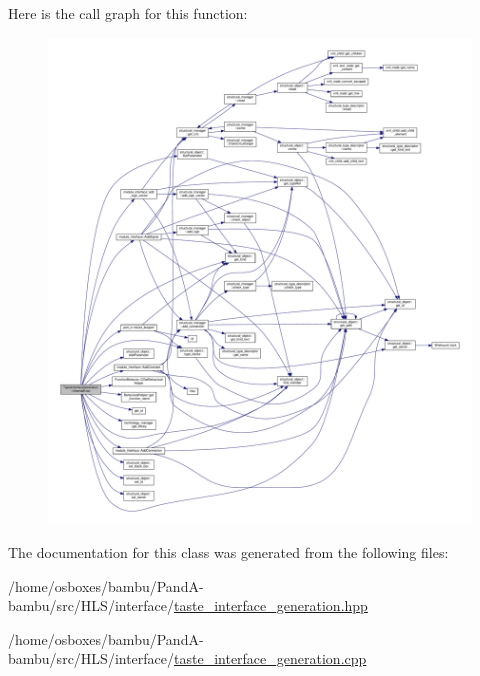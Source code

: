 Here is the call graph for this function\+:
\nopagebreak
\begin{figure}[H]
\begin{center}
\leavevmode
\includegraphics[width=350pt]{dc/d30/classTasteInterfaceGeneration_ae0e9b26f9d75ef90566c8b22071c7cf9_cgraph}
\end{center}
\end{figure}


The documentation for this class was generated from the following files\+:\begin{DoxyCompactItemize}
\item 
/home/osboxes/bambu/\+Pand\+A-\/bambu/src/\+H\+L\+S/interface/\hyperlink{taste__interface__generation_8hpp}{taste\+\_\+interface\+\_\+generation.\+hpp}\item 
/home/osboxes/bambu/\+Pand\+A-\/bambu/src/\+H\+L\+S/interface/\hyperlink{taste__interface__generation_8cpp}{taste\+\_\+interface\+\_\+generation.\+cpp}\end{DoxyCompactItemize}
